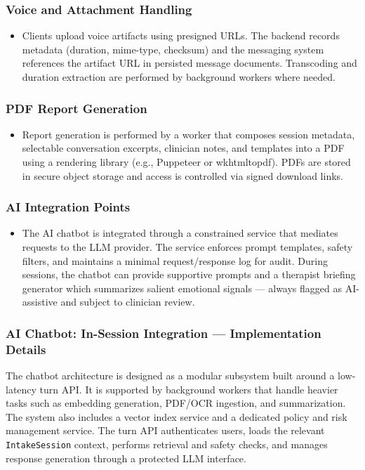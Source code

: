 \documentclass[a4paper,12pt]{report}
\begin{document}
\subsubsection{Voice and Attachment Handling}
\begin{itemize}[leftmargin=*]
  \item[--] Clients upload voice artifacts using presigned URLs. The backend records metadata (duration, mime-type, checksum) and the messaging system references the artifact URL in persisted message documents. Transcoding and duration extraction are performed by background workers where needed.
\end{itemize}

\subsubsection{PDF Report Generation}
\begin{itemize}[leftmargin=*]
  \item[--] Report generation is performed by a worker that composes session metadata, selectable conversation excerpts, clinician notes, and templates into a PDF using a rendering library (e.g., Puppeteer or wkhtmltopdf). PDFs are stored in secure object storage and access is controlled via signed download links.
\end{itemize}

\subsubsection{AI Integration Points}
\begin{itemize}[leftmargin=*]
  \item[--] The AI chatbot is integrated through a constrained service that mediates requests to the LLM provider. The service enforces prompt templates, safety filters, and maintains a minimal request/response log for audit. During sessions, the chatbot can provide supportive prompts and a therapist briefing generator which summarizes salient emotional signals --- always flagged as AI-assistive and subject to clinician review.
\end{itemize}

\subsubsection{AI Chatbot: In-Session Integration --- Implementation Details}
The chatbot architecture is designed as a modular subsystem built around a low-latency turn API. It is supported by background workers that handle heavier tasks such as embedding generation, PDF/OCR ingestion, and summarization. The system also includes a vector index service and a dedicated policy and risk management service. The turn API authenticates users, loads the relevant \texttt{IntakeSession} context, performs retrieval and safety checks, and manages response generation through a protected LLM interface.
\end{document}
